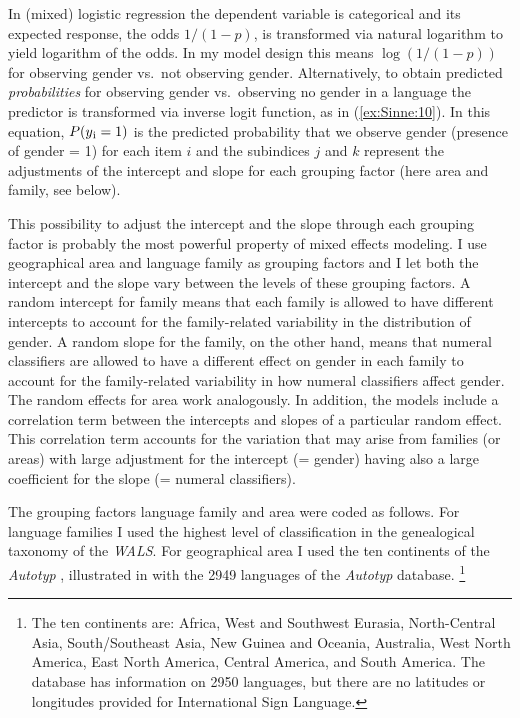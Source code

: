 \documentclass[output=collectionpaper]{langsci/langscibook}
\begin{document}
In (mixed) logistic regression the dependent variable is categorical and its expected response, the odds $1/(1-p)$, is transformed via natural logarithm to yield logarithm of the odds. In my model design this means $\log(1/(1-p))$ for observing gender vs.\ not observing gender. Alternatively, to obtain predicted \textit{probabilities} for observing gender vs.\ observing no gender in a language the predictor is transformed via inverse logit function, as in (\ref{ex:Sinne:10}). In this equation, $P(y\textsubscript{i} = 1)$ is the predicted probability that we observe gender (presence of gender = 1) for each item $i$ and the subindices $j$ and $k$ represent the adjustments of the intercept and slope for each grouping factor (here area and family, see below).

This possibility to adjust the intercept and the slope through each grouping factor is probably the most powerful property of mixed effects modeling. I use geographical area and language family as grouping factors and I let both the intercept and the slope vary between the levels of these grouping factors. A random intercept for family means that each family is allowed to have different intercepts to account for the family-related variability in the distribution of gender. A random slope for the family, on the other hand, means that numeral classifiers are allowed to have a different effect on gender in each family to account for the family-related variability in how numeral classifiers affect gender. The random effects for area work analogously. In addition, the models include a correlation term between the intercepts and slopes of a particular random effect. This correlation term accounts for the variation that may arise from families (or areas) with large adjustment for the intercept (= gender) having also a large coefficient for the slope (= numeral classifiers).

The grouping factors language family and area were coded as follows. For language families I used the highest level of classification in the genealogical taxonomy of the \textit{WALS}. For geographical area I used the ten continents of the \textit{Autotyp} \citep{Bickel2017}, illustrated in  with the 2949 languages of the \textit{Autotyp} database.%
\footnote{The ten continents are: Africa, West and Southwest Eurasia, North-Central Asia, South/Southeast Asia, New Guinea and Oceania, Australia, West North America, East North America, Central America, and South America. The database has information on 2950 languages, but there are no latitudes or longitudes provided for International Sign Language.}
\end{document}
